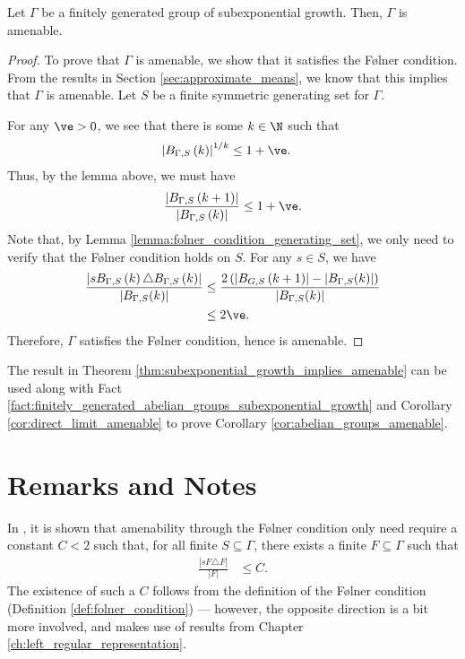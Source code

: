 \begin{theorem}\label{thm:subexponential_growth_implies_amenable}
  Let $\Gamma$ be a finitely generated group of subexponential growth. Then, $\Gamma$ is amenable.
\end{theorem}
\begin{proof}
  To prove that $\Gamma$ is amenable, we show that it satisfies the Følner condition. From the results in Section \ref{sec:approximate_means}, we know that this implies that $\Gamma$ is amenable. Let $S$ be a finite symmetric generating set for $\Gamma$.\newline

  For any $\ve > 0$, we see that there is some $k\in \N$ such that
  \begin{align*}
    \left\vert B_{\Gamma,S}\left(k\right) \right\vert^{1/k} &\leq 1 + \ve.
  \end{align*}
  Thus, by the lemma above, we must have
  \begin{align*}
    \frac{\left\vert B_{\Gamma,S}\left(k+1\right) \right\vert}{\left\vert B_{\Gamma,S} \left(k\right)\right\vert} \leq 1 + \ve.
  \end{align*}
  Note that, by Lemma \ref{lemma:folner_condition_generating_set}, we only need to verify that the Følner condition holds on $S$. For any $s\in S$, we have
  \begin{align*}
    \frac{\left\vert sB_{\Gamma,S}\left(k\right)\triangle B_{\Gamma,S}\left(k\right) \right\vert}{\left\vert B_{\Gamma,S}(k) \right\vert} &\leq \frac{2\left(\left\vert B_{G,S}\left(k+1\right) \right\vert - \left\vert B_{\Gamma,S}(k) \right\vert\right)}{\left\vert B_{\Gamma,S}(k) \right\vert}\\
                                                                                                                    &\leq 2\ve.
  \end{align*}
  Therefore, $\Gamma$ satisfies the Følner condition, hence is amenable.
\end{proof}
\begin{remark}
  The result in Theorem \ref{thm:subexponential_growth_implies_amenable} can be used along with Fact \ref{fact:finitely_generated_abelian_groups_subexponential_growth} and Corollary \ref{cor:direct_limit_amenable} to prove Corollary \ref{cor:abelian_groups_amenable}.
\end{remark}
\section{Remarks and Notes}%
In \cite[Appendix A.3]{juschenko_amenability}, it is shown that amenability through the Følner condition only need require a constant $C < 2$ such that, for all finite $S\subseteq \Gamma$, there exists a finite $F\subseteq \Gamma$ such that
\begin{align*}
  \frac{\left\vert sF\triangle F \right\vert}{\left\vert F \right\vert} &\leq C.
\end{align*}
The existence of such a $C$ follows from the definition of the Følner condition (Definition \ref{def:folner_condition}) --- however, the opposite direction is a bit more involved, and makes use of results from Chapter \ref{ch:left_regular_representation}.\newline

